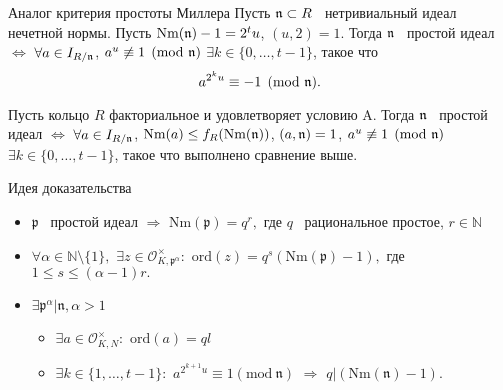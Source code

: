 \documentclass[8pt, xcolor=x11names]{beamer}
\begin{document}
\begin{frame}
    \begin{block}{Аналог критерия простоты Миллера}
        Пусть $\mathfrak{n} \subset R$ \textendash\ нетривиальный идеал нечетной нормы.
        Пусть $\textrm{Nm}(\mathfrak{n}) - 1 = 2^t u$, $(u, 2) = 1$.
        Тогда $\mathfrak{n}$ \textendash\ простой идеал $\Leftrightarrow$ $\forall a \in I_{R/\mathfrak{n}}$, $a^u \not\equiv 1 \pmod{\mathfrak{n}}$ $\exists k\in \{0, \dots, t-1\}$, такое что
        \begin{equation*}\label{eq:miller}
            a^{2^{k}u} \equiv -1 \pmod{\mathfrak{n}}.
        \end{equation*}
    
        Пусть кольцо $R$ факториальное и удовлетворяет условию A.
        Тогда $\mathfrak{n}$ \textendash\ простой идеал $\Leftrightarrow$ $\forall a \in I_{R/\mathfrak{n}}$, $\textrm{Nm}(a) \le f_R(\textrm{Nm}(\mathfrak{n}))$, $(a, \mathfrak{n}) = 1$, $a^u \not\equiv 1 \pmod{\mathfrak{n}}$ $\exists k\in \{0, \dots, t-1\}$, такое что выполнено сравнение выше.
    \end{block}
    
    \begin{block}{Идея доказательства}
        \begin{itemize}
            \item $\mathfrak{p}$ \textendash\ простой идеал $\Rightarrow$ $\textrm{Nm}(\mathfrak{p})=q^r,$ где $q$ \textendash\ рациональное простое, $r \in \mathbb{N}$
            
            \item $\forall \alpha \in \mathbb{N} \setminus \{1\},$ $\exists z \in \mathcal{O}_{K,\mathfrak{p}^{\alpha}}^\times:$ $\textrm{ord}(z)=q^s(\textrm{Nm}(\mathfrak{p})-1),$ где $1 \le s \le (\alpha-1)r.$
            
            \item $\exists \mathfrak{p}^\alpha|\mathfrak{n}, \alpha > 1$
            \begin{itemize}
                \item $\exists a \in \mathcal{O}_{K, N}^\times:$ $\textrm{ord}(a)=ql$
                
                \item $\exists k \in \{1,\ldots, t-1\}:$ $a^{2^{k+1}u} \equiv 1 (\textrm{mod} \ \mathfrak{n})$ $\Rightarrow$ $q|(\textrm{Nm}(\mathfrak{n})-1).$
            \end{itemize}
                

\end{itemize}
\end{block}
\end{frame}
\end{document}
